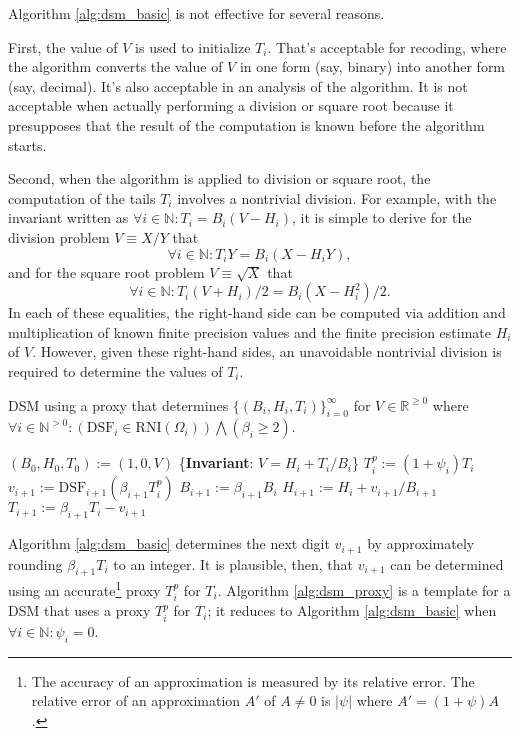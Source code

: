 \documentclass[10pt]{article}
\theoremstyle{definition}
\theoremstyle{remark}
\numberwithin{equation}{section}
\newcommand{\assign}{:=}
\newcommand{\dsf}{\text{DSF}}
\newcommand{\rni}[1]{\text{RNI}({#1})}
\newcommand{\nats}{\mathbb{N}}
\newcommand{\pnats}{\mathbb{N}^{>0}}
\newcommand{\nnreals}{\mathbb{R}^{\ge0}}
\newcommand{\abs}[1]{\lvert #1 \rvert}
\begin{document}
Algorithm \ref{alg:dsm_basic} is not effective for several reasons.

First, the value of $V$ is used to initialize $T_i$. 
That's acceptable for recoding, where the algorithm converts the value of $V$ in one form (say, binary) into another form (say, decimal). 
It's also acceptable in an analysis of the algorithm. 
It is not acceptable when actually performing a division or square root because it presupposes that the
result of the computation is known before the algorithm starts.

Second, when the algorithm is applied to division or square root, the computation of the tails $T_i$ involves a nontrivial division.
For example, with the invariant written as $\forall i \in \nats: T_i = B_i(V - H_i)$, it is simple to derive for the division problem $V \equiv X/Y$ that
\[
\forall i \in \nats: T_i Y = B_i(X - H_i Y) ,
\]
and for the square root problem $V \equiv \sqrt{X}$ that
\[
\forall i \in \nats: T_i (V+H_i)/2 = B_i(X-H_i^2)/2 .
\]
In each of these equalities, the right-hand side can be computed via addition and multiplication of known finite precision values and the finite precision estimate $H_i$ of $V$.
However, given these right-hand sides, an unavoidable nontrivial division is required to determine the values of $T_i$.

\begin{algorithm}[t]
	\caption{DSM using a proxy that determines $\{(B_i, H_i, T_i)\}_{i=0}^\infty$ for $V \in \nnreals$ where $\forall i \in \pnats: (\dsf_i \in \rni{\Omega_i}) \bigwedge (\beta_i \ge 2)$.\label{alg:dsm_proxy}}
	\begin{algorithmic}[0] %
		\State $(B_0, H_0, T_0) \assign (1, 0, V)$
		\For{$i \assign 0,1,2,\ldots$}
		\State \{\textbf{Invariant}: $V = H_{i} + T_{i}/B_{i}$\}
		\State $T^p_i   \assign (1+\psi_i) T_i$
		\State $v_{i+1} \assign \dsf_{i+1}(\beta_{i+1} T^p_i)$
		\State $B_{i+1} \assign \beta_{i+1} B_{i}$
		\State $H_{i+1} \assign H_{i} + v_{i+1}/B_{i+1}$
		\State $T_{i+1} \assign \beta_{i+1} T_{i} - v_{i+1}$
		\EndFor
		\EndProcedure
	\end{algorithmic}
\end{algorithm} 

Algorithm \ref{alg:dsm_basic} determines the next digit $v_{i+1}$ by approximately rounding $\beta_{i+1} T_i$ to an integer. 
It is plausible, then, that $v_{i+1}$ can be determined using an accurate\footnote{The accuracy of an approximation is measured by its relative error. 
The relative error of an approximation $A'$ of $A \ne 0$ is $\abs{\psi}$ where $A' = (1+\psi) A$.}
proxy $T^p_i$ for $T_i$. 
Algorithm \ref{alg:dsm_proxy} is a template for a DSM that uses a proxy $T^p_i$ for $T_i$; it reduces to Algorithm \ref{alg:dsm_basic} when  $\forall i \in \nats: \psi_i = 0$. 
\end{document}
